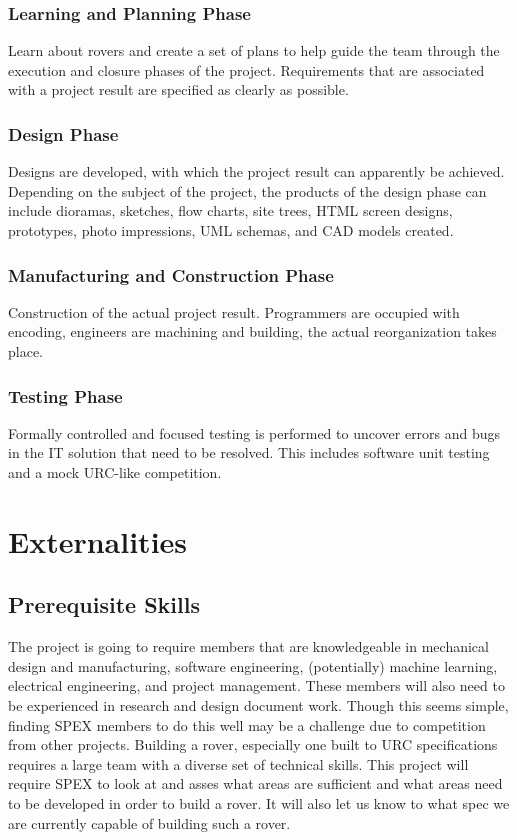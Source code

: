 \documentclass[conference]{IEEEtran} %
\begin{document}
\subsubsection{Learning and Planning Phase}
\label{subsubsec:phaseone}
Learn about rovers and create a set of plans to help guide the team through the execution and closure phases of the project. Requirements that are associated with a project result are specified as clearly as possible.
\subsubsection{Design Phase}
\label{subsubsec:phasetwo}
Designs are developed, with which the project result can apparently be achieved. Depending on the subject of the project, the products of the design phase can include dioramas, sketches, flow charts, site trees, HTML screen designs, prototypes, photo impressions, UML schemas, and CAD models created.
\subsubsection{Manufacturing and Construction Phase}
\label{subsubsec:phasethree}
Construction of the actual project result. Programmers are occupied with encoding, engineers are machining and building, the actual reorganization takes place.
\subsubsection{Testing Phase}
\label{subsubsec:phasefour}
Formally controlled and focused testing is performed to uncover errors and bugs in the IT solution that need to be resolved. This includes software unit testing and a mock URC-like competition. 

\section{Externalities}
\label{sec:externalities}
\subsection{Prerequisite Skills}
\label{subsec:skills}
The project is going to require members that are knowledgeable in mechanical design and manufacturing, software engineering, (potentially) machine learning, electrical engineering, and project management. 
These members will also need to be experienced in research and design document work. 
Though this seems simple, finding SPEX members to do this well may be a challenge due to competition from other projects. 
Building a rover, especially one built to URC specifications requires a large team with a diverse set of technical skills. 
This project will require SPEX to look at and asses what areas are sufficient and what areas need to be developed in order to build a rover. 
It will also let us know to what spec we are currently capable of building such a rover. 
\end{document}
